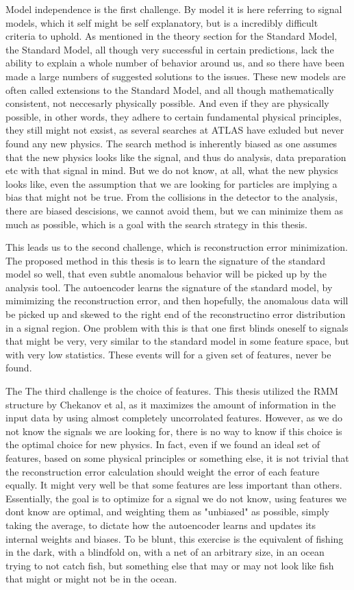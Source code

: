 Model independence is the first challenge. By model it is here referring to signal models, which it self might be self 
explanatory, but is a incredibly difficult criteria to uphold. As mentioned in the theory section for the Standard Model, 
the Standard Model, all though very successful in certain predictions, lack the ability to explain a whole number of 
behavior around us, and so there have been made a large numbers of suggested solutions to the issues. These new models are 
often called extensions to the Standard Model, and all though mathematically consistent, not neccesarly physically possible. 
And even if they are physically possible, in other words, they adhere to certain fundamental physical principles, they 
still might not exsist, as several searches at ATLAS have exluded but never found any new physics. The search method is inherently 
biased as one assumes that the new physics looks like the signal, and thus do analysis, data preparation etc with that 
signal in mind. But we do not know, at all, what the new physics looks like, even the assumption that we are looking for 
particles are implying a bias that might not be true. From the collisions in the detector to the analysis, there are biased descisions, 
we cannot avoid them, but we can minimize them as much as possible, which is a goal with the search strategy in this thesis. \par
This leads us to the second challenge, which is reconstruction error minimization. The proposed method in this thesis is to 
learn the signature of the standard model so well, that even subtle anomalous behavior will be picked up by the analysis tool. 
The autoencoder learns the signature of the standard model, by mimimizing the reconstruction error, and then hopefully, the 
anomalous data will be picked up and skewed to the right end of the reconstructino error distribution in a signal region. 
One problem with this is that one first blinds oneself to signals that might be very, very similar to the standard model in some 
feature space, but with very low statistics. These events will for a given set of features, never be found. \par 
The The third challenge is the choice of features. This thesis utilized the RMM structure by Chekanov et al, as it maximizes 
the amount of information in the input data by using almost completely uncorrolated features. However, as we do not know the signals 
we are looking for, there is no way to know if this choice is the optimal choice for new physics. In fact, even if we found 
an ideal set of features, based on some physical principles or something else, it is not trivial that the reconstruction error calculation
should weight the error of each feature equally. It might very well be that some features are less important than others. Essentially, 
the goal is to optimize for a signal we do not know, using features we dont know are optimal, and weighting them as "unbiased" as 
possible, simply taking the average, to dictate how the autoencoder learns and updates its internal weights and biases. 
To be blunt, this exercise is the equivalent of fishing in the dark, with a blindfold on, with a net of an arbitrary size, 
in an ocean trying to not catch fish, but something else that may or may not look like fish that might or might not be in the ocean. 
